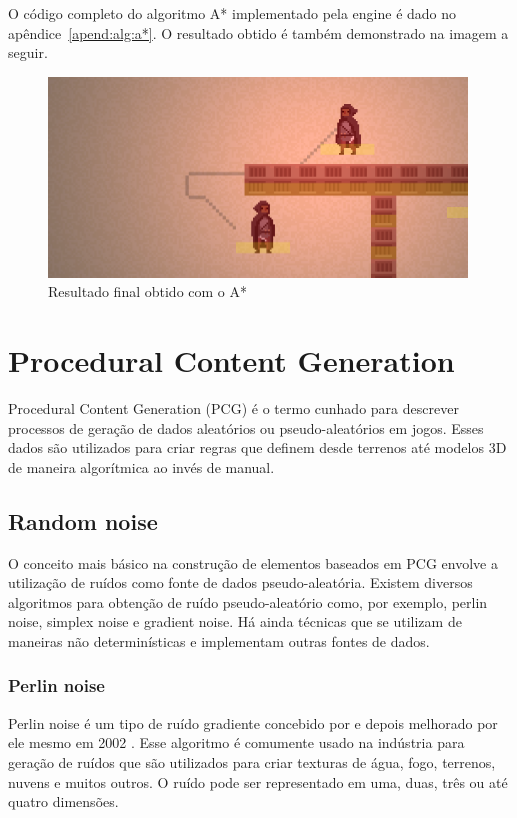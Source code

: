 \documentclass[12pt, 
openright, 
oneside, 
a4paper,    
brazil]{facom-ufu-abntex2}
\begin{document}
O código completo do algoritmo A* implementado pela engine é dado no apêndice~\ref{apend:alg:a*}. O resultado obtido é também demonstrado na imagem a seguir.

\begin{figure}[H]
	\centering
	\includegraphics[width=30em]{imagens/pathPlanning.png}
	\caption{Resultado final obtido com o A* }
\end{figure}

\chapter{Procedural Content Generation}
Procedural Content Generation (PCG) é o termo cunhado para descrever processos de geração de dados aleatórios ou pseudo-aleatórios em jogos. Esses dados são utilizados para criar regras que definem desde terrenos até modelos 3D de maneira algorítmica ao invés de manual.

\section{Random noise}
O conceito mais básico na construção de elementos baseados em PCG envolve a utilização de ruídos como fonte de dados pseudo-aleatória. Existem diversos algoritmos para obtenção de ruído pseudo-aleatório como, por exemplo, perlin noise, simplex noise e gradient noise. Há ainda técnicas que se utilizam de maneiras não determinísticas e implementam outras fontes de dados.

\subsection{Perlin noise}
Perlin noise é um tipo de ruído gradiente concebido por  e depois melhorado por ele mesmo em 2002 \cite{Perlin:2002:IN:566654.566636}. Esse algoritmo é comumente usado na indústria para geração de ruídos que são utilizados para criar texturas de água, fogo, terrenos, nuvens e muitos outros. O ruído pode ser representado em uma, duas, três ou até quatro dimensões.
\end{document}

